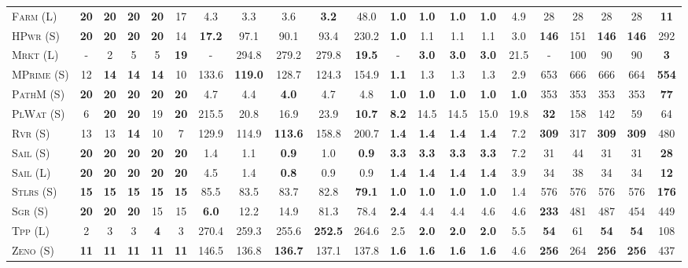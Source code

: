 \begin{table}[tb]
{\begin{tabular}{|l||ccccc||ccccc||ccccc||ccccc||}
\textsc{Farm} (L)&\textbf{20}&\textbf{20}&\textbf{20}&\textbf{20}&17&4.3&3.3&3.6&\textbf{3.2}&48.0&\textbf{1.0}&\textbf{1.0}&\textbf{1.0}&\textbf{1.0}&4.9&28&28&28&28&\textbf{11}\\
\textsc{HPwr} (S)&\textbf{20}&\textbf{20}&\textbf{20}&\textbf{20}&14&\textbf{17.2}&97.1&90.1&93.4&230.2&\textbf{1.0}&1.1&1.1&1.1&3.0&\textbf{146}&151&\textbf{146}&\textbf{146}&292\\
\textsc{Mrkt} (L)&-&2&5&5&\textbf{19}&-&294.8&279.2&279.8&\textbf{19.5}&-&\textbf{3.0}&\textbf{3.0}&\textbf{3.0}&21.5&-&100&90&90&\textbf{3}\\
\textsc{MPrime} (S)&12&\textbf{14}&\textbf{14}&\textbf{14}&10&133.6&\textbf{119.0}&128.7&124.3&154.9&\textbf{1.1}&1.3&1.3&1.3&2.9&653&666&666&664&\textbf{554}\\
\textsc{PathM} (S)&\textbf{20}&\textbf{20}&\textbf{20}&\textbf{20}&\textbf{20}&4.7&4.4&\textbf{4.0}&4.7&4.8&\textbf{1.0}&\textbf{1.0}&\textbf{1.0}&\textbf{1.0}&\textbf{1.0}&353&353&353&353&\textbf{77}\\
\textsc{PlWat} (S)&6&\textbf{20}&\textbf{20}&19&\textbf{20}&215.5&20.8&16.9&23.9&\textbf{10.7}&\textbf{8.2}&14.5&14.5&15.0&19.8&\textbf{32}&158&142&59&64\\
\textsc{Rvr} (S)&13&13&\textbf{14}&10&7&129.9&114.9&\textbf{113.6}&158.8&200.7&\textbf{1.4}&\textbf{1.4}&\textbf{1.4}&\textbf{1.4}&7.2&\textbf{309}&317&\textbf{309}&\textbf{309}&480\\
\textsc{Sail} (S)&\textbf{20}&\textbf{20}&\textbf{20}&\textbf{20}&\textbf{20}&1.4&1.1&\textbf{0.9}&1.0&\textbf{0.9}&\textbf{3.3}&\textbf{3.3}&\textbf{3.3}&\textbf{3.3}&7.2&31&44&31&31&\textbf{28}\\
\textsc{Sail} (L)&\textbf{20}&\textbf{20}&\textbf{20}&\textbf{20}&\textbf{20}&4.5&1.4&\textbf{0.8}&0.9&0.9&\textbf{1.4}&\textbf{1.4}&\textbf{1.4}&\textbf{1.4}&3.9&34&38&34&34&\textbf{12}\\
\textsc{Stlrs} (S)&\textbf{15}&\textbf{15}&\textbf{15}&\textbf{15}&\textbf{15}&85.5&83.5&83.7&82.8&\textbf{79.1}&\textbf{1.0}&\textbf{1.0}&\textbf{1.0}&\textbf{1.0}&1.4&576&576&576&576&\textbf{176}\\
\textsc{Sgr} (S)&\textbf{20}&\textbf{20}&\textbf{20}&15&15&\textbf{6.0}&12.2&14.9&81.3&78.4&\textbf{2.4}&4.4&4.4&4.6&4.6&\textbf{233}&481&487&454&449\\
\textsc{Tpp} (L)&2&3&3&\textbf{4}&3&270.4&259.3&255.6&\textbf{252.5}&264.6&2.5&\textbf{2.0}&\textbf{2.0}&\textbf{2.0}&5.5&\textbf{54}&61&\textbf{54}&\textbf{54}&108\\
\textsc{Zeno} (S)&\textbf{11}&\textbf{11}&\textbf{11}&\textbf{11}&\textbf{11}&146.5&136.8&\textbf{136.7}&137.1&137.8&\textbf{1.6}&\textbf{1.6}&\textbf{1.6}&\textbf{1.6}&4.6&\textbf{256}&264&\textbf{256}&\textbf{256}&437\\

\end{tabular}}
\end{table}
